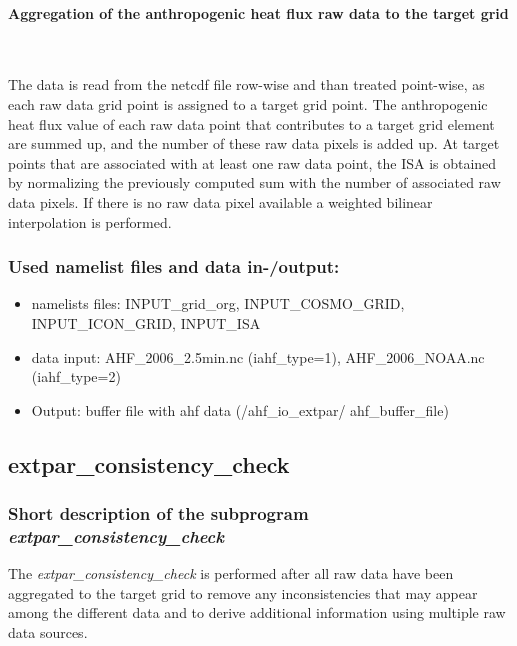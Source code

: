 \documentclass[a4paper,10pt,DIV14,BCOR1cm,titlepage,twoside]{scrartcl}
\begin{document}
\paragraph{Aggregation of the anthropogenic heat flux raw data to the target grid} \ \par\medskip\noindent
The data is read from the netcdf file row-wise and than treated point-wise, as each raw data grid point is assigned to a target grid point. The anthropogenic heat flux value of each raw data point that contributes to a target grid element are summed up, and the number of these raw data pixels is added up. At target points that are associated with at least one raw data point, the ISA is obtained by normalizing the previously computed sum with the number of associated raw data pixels. If there is no raw data pixel available a weighted bilinear interpolation is performed.\par\medskip\noindent
\subsubsection{Used namelist files and data in-/output:}
\begin{itemize}
 \item namelists files: INPUT\_grid\_org, INPUT\_COSMO\_GRID, INPUT\_ICON\_GRID, INPUT\_ISA
 \item data input: AHF\_2006\_2.5min.nc (iahf\_type=1), AHF\_2006\_NOAA.nc (iahf\_type=2)
 \item Output: buffer file with ahf data (/ahf\_io\_extpar/ ahf\_buffer\_file)
\end{itemize}


\subsection{extpar\_consistency\_check}\label{extpar_consistency_check}
\subsubsection{Short description of the subprogram \textit{extpar\_consistency\_check}}
The \textit{extpar\_consistency\_check} is performed after all raw data have been aggregated to the target grid to remove any inconsistencies that may appear among the different data and to derive additional information using multiple raw data sources.\par\medskip\noindent
\end{document}
